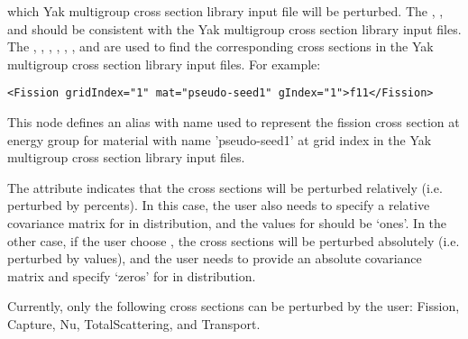 which Yak multigroup cross section library input file will be perturbed.
The , , and 
should be consistent with the Yak multigroup cross section library input files.
The , , , , ,
, and  are used to find the corresponding cross sections in the Yak multigroup cross
section library input files. For example:
%
\begin{lstlisting}[style=XML]
<Fission gridIndex="1" mat="pseudo-seed1" gIndex="1">f11</Fission>
\end{lstlisting}
%
This node defines an alias with name  used to represent the fission cross section at energy group 
for material with name 'pseudo-seed1' at grid index  in the Yak multigroup cross section library input files.

\nb The attribute  indicates that the cross sections will be perturbed relatively (i.e. perturbed by
percents). In this case, the user also needs to specify a relative covariance matrix for  in
 distribution, and the values for  should be `ones'. In the other case, if
the user choose , the cross sections will be perturbed absolutely (i.e. perturbed by values), and
the user needs to provide an absolute covariance matrix and specify `zeros' for  in 
distribution.

\nb Currently, only the following cross sections can be perturbed by the user: Fission, Capture, Nu, TotalScattering,
and Transport.


